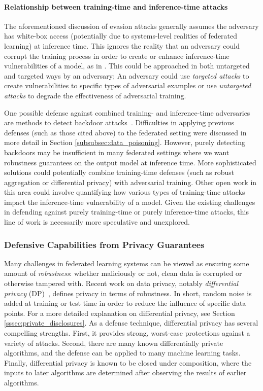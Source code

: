 \documentclass[11pt]{article}
\begin{document}
\paragraph{Relationship between training-time and inference-time attacks}\label{p:training-inference-attacks} 
The aforementioned discussion of evasion attacks generally assumes the adversary has white-box access (potentially due to systems-level realities of federated learning) at inference time. This ignores the reality that an adversary could corrupt the training process in order to create or enhance inference-time vulnerabilities of a model, as in \cite{chen2017targeted}. This could be approached in both untargeted and targeted ways by an adversary; An adversary could use \emph{targeted attacks} to create vulnerabilities to specific types of adversarial examples \cite{chen2017targeted, gu2017badnets} or use \emph{untargeted attacks} to degrade the effectiveness of adversarial training.

One possible defense against combined training- and inference-time adversaries are methods to detect backdoor attacks~\cite{tran2018spectral, chen2018detecting, wang2019neural,chou2018sentinet}. Difficulties in applying previous defenses (such as those cited above) to the federated setting were discussed in more detail in Section \ref{subsubsec:data_poisoning}. However, purely detecting backdoors may be insufficient in many federated settings where we want robustness guarantees on the output model at inference time. More sophisticated solutions could potentially combine training-time defenses (such as robust aggregation or differential privacy) with adversarial training. Other open work in this area could involve quantifying how various types of training-time attacks impact the inference-time vulnerability of a model. Given the existing challenges in defending against purely training-time or purely inference-time attacks, this line of work is necessarily more speculative and unexplored.

\subsubsection{Defensive Capabilities from Privacy Guarantees}

Many challenges in federated learning systems can be viewed as ensuring some amount of \emph{robustness}: whether maliciously or not, clean data is corrupted or otherwise tampered with. Recent work on data privacy, notably \emph{differential privacy} (DP)~\citep{DMNS06}, defines privacy in terms of robustness. In short, random noise is added at training or test time in order to reduce the influence of specific data points. For a more detailed explanation on differential privacy, see Section \ref{sssec:private_disclosures}. As a defense technique, differential privacy has several compelling strengths. First, it provides strong, worst-case protections against a variety of attacks. Second, there are many known differentially private algorithms, and the defense can be applied to many machine learning tasks. Finally, differential privacy is known to be closed under composition, where the inputs to later algorithms are determined after observing the results of earlier algorithms.
\end{document}
